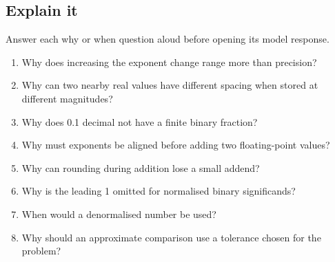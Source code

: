 \documentclass[11pt]{article}
\begin{document}
\begin{keepsection}
\section{Explain it}

Answer each why or when question aloud before opening its model response.

\begin{enumerate}
\item Why does increasing the exponent change range more than precision?
\item Why can two nearby real values have different spacing when stored at different magnitudes?
\item Why does 0.1 decimal not have a finite binary fraction?
\item Why must exponents be aligned before adding two floating-point values?
\item Why can rounding during addition lose a small addend?
\item Why is the leading 1 omitted for normalised binary significands?
\item When would a denormalised number be used?
\item Why should an approximate comparison use a tolerance chosen for the problem?
\end{enumerate}

\end{keepsection}

\clearpage
\end{document}
